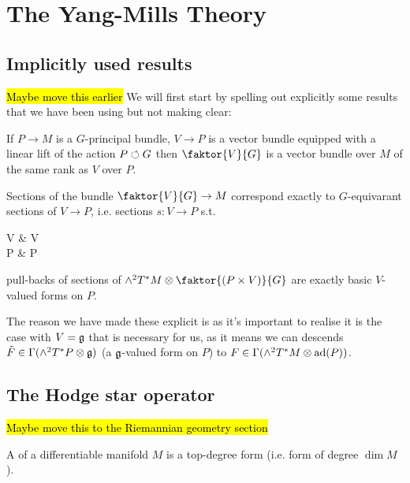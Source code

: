 \documentclass{article}
\begin{document}
\section{The Yang-Mills Theory}
\subsection{Implicitly used results}

\hl{Maybe move this earlier}
We will first start by spelling out explicitly some results that we have been using but not making clear:

\begin{lemma}
	If $P \to M$ is a $G$-principal bundle, $V \to P$ is a vector bundle equipped with a linear lift of the action $P \circlearrowleft G$ then $\faktor{V}{G}$ is a vector bundle over $M$ of the same rank as $V$ over $P$. 
\end{lemma}

\begin{lemma}
	Sections of the bundle $\faktor{V}{G} \to M$ correspond exactly to $G$-equivarant sections of $V \to P$, i.e. sections $s:V\to P$ s.t. 
	\begin{tkz}
	V \arrow[r,"g"] \arrow[d] & V \arrow[d] \\ P \arrow[r,"g"'] \arrow[u,bend left=20,"s"] & P \arrow[u,bend right=20, "s"']
	\end{tkz} 
\end{lemma}

\begin{lemma}
	pull-backs of sections of $\wedge^2 T^\ast M \otimes \faktor{(P \times V)}{G}$ are exactly basic $V$-valued forms on $P$. 
\end{lemma}

The reason we have made these explicit is as it's important to realise it is the case with $V= \mathfrak{g}$ that is necessary for us, as it means we can descends $\tilde{F} \in \Gamma(\wedge^2 T^\ast P \otimes \mathfrak{g})$ (a $\mathfrak{g}$-valued form on $P$) to $F\in \Gamma(\wedge^2 T^\ast M \otimes \operatorname{ad}(P))$. 

\subsection{The Hodge star operator}
\hl{Maybe move this to the Riemannian geometry section}

\begin{definition}
	A  of a differentiable manifold $M$ is a top-degree form (i.e. form of degree $\dim M$). 
\end{definition}
\end{document}
